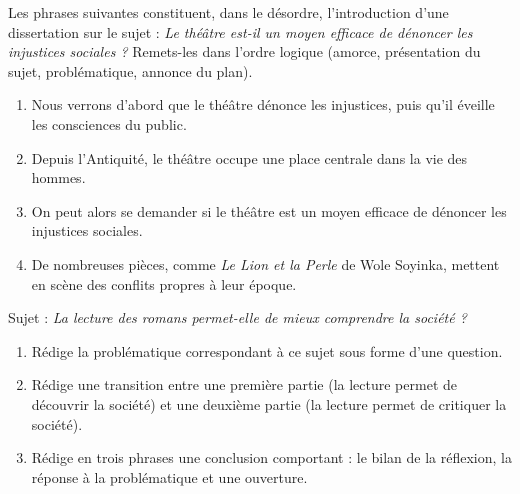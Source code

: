 \documentclass[11pt]{article}
\begin{document}
\begin{exercice}
Les phrases suivantes constituent, dans le désordre, l'introduction d'une dissertation sur le sujet : \emph{Le théâtre est-il un moyen efficace de dénoncer les injustices sociales ?} Remets-les dans l'ordre logique (amorce, présentation du sujet, problématique, annonce du plan).
\begin{enumerate}
\item Nous verrons d'abord que le théâtre dénonce les injustices, puis qu'il éveille les consciences du public.
\item Depuis l'Antiquité, le théâtre occupe une place centrale dans la vie des hommes.
\item On peut alors se demander si le théâtre est un moyen efficace de dénoncer les injustices sociales.
\item De nombreuses pièces, comme \emph{Le Lion et la Perle} de Wole Soyinka, mettent en scène des conflits propres à leur époque.
\end{enumerate}
\end{exercice}

\begin{exercice}
Sujet : \emph{La lecture des romans permet-elle de mieux comprendre la société ?}
\begin{enumerate}
\item Rédige la problématique correspondant à ce sujet sous forme d'une question.
\item Rédige une transition entre une première partie (\og{}la lecture permet de découvrir la société\fg{}) et une deuxième partie (\og{}la lecture permet de critiquer la société\fg{}).
\item Rédige en trois phrases une conclusion comportant : le bilan de la réflexion, la réponse à la problématique et une ouverture.
\end{enumerate}
\end{exercice}
\end{document}
